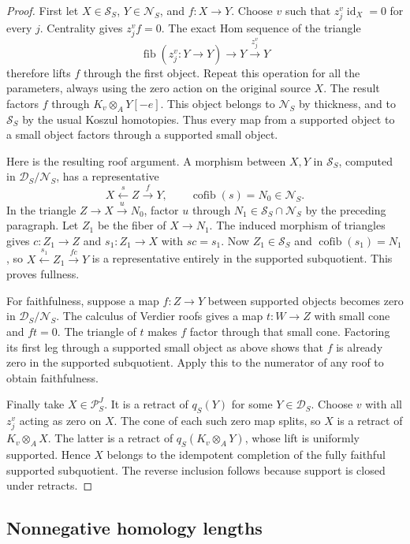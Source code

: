 \begin{proof}
First let $X\in\mathcal S_S$, $Y\in\mathcal N_S$, and
$f:X\to Y$. Choose $v$ such that $z_j^v\operatorname{id}_X=0$
for every $j$. Centrality gives $z_j^vf=0$. The exact Hom sequence
of the triangle
\[
 \operatorname{fib}(z_j^v:Y\to Y)\longrightarrow Y
 \xrightarrow{z_j^v}Y
\]
therefore lifts $f$ through the first object. Repeat this operation
for all the parameters, always using the zero action on the original
source $X$. The result factors $f$ through
$K_v\otimes_A Y[-e]$. This object belongs to $\mathcal N_S$ by
thickness, and to $\mathcal S_S$ by the usual Koszul homotopies.
Thus every map from a supported object to a small object factors
through a supported small object.

Here is the resulting roof argument. A morphism between $X,Y$ in
$\mathcal S_S$, computed in $\mathcal D_S/\mathcal N_S$, has a
representative
\[
 X\xleftarrow{s}Z\xrightarrow{f}Y,
 \qquad \operatorname{cofib}(s)=N_0\in\mathcal N_S.
\]
In the triangle $Z\to X\xrightarrow{u}N_0$, factor $u$ through
$N_1\in\mathcal S_S\cap\mathcal N_S$ by the preceding paragraph.
Let $Z_1$ be the fiber of $X\to N_1$. The induced morphism of
triangles gives $c:Z_1\to Z$ and $s_1:Z_1\to X$ with $sc=s_1$.
Now $Z_1\in\mathcal S_S$ and $\operatorname{cofib}(s_1)=N_1$,
so $X\xleftarrow{s_1}Z_1\xrightarrow{fc}Y$ is a representative
entirely in the supported subquotient. This proves fullness.

For faithfulness, suppose a map $f:Z\to Y$ between supported
objects becomes zero in $\mathcal D_S/\mathcal N_S$. The calculus
of Verdier roofs gives a map $t:W\to Z$ with small cone and $ft=0$.
The triangle of $t$ makes $f$ factor through that small cone.
Factoring its first leg through a supported small object as above
shows that $f$ is already zero in the supported subquotient. Apply
this to the numerator of any roof to obtain faithfulness.

Finally take $X\in\mathcal P_S^J$. It is a retract of $q_S(Y)$
for some $Y\in\mathcal D_S$. Choose $v$ with all $z_j^v$ acting
as zero on $X$. The cone of each such zero map splits, so $X$ is a
retract of $K_v\otimes_A X$. The latter is a retract of
$q_S(K_v\otimes_A Y)$, whose lift is uniformly supported. Hence
$X$ belongs to the idempotent completion of the fully faithful
supported subquotient. The reverse inclusion follows because
support is closed under retracts.
\end{proof}

\subsection{Nonnegative homology lengths}

